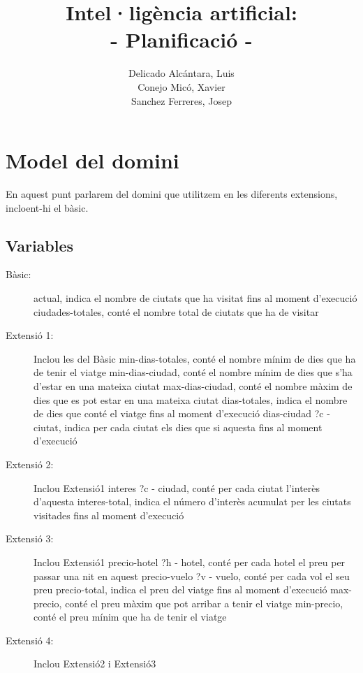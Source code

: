 \documentclass[11pt,a4paper]{article}
\author{
  Delicado Alcántara, Luis
  \\
  Conejo Micó, Xavier
  \\
  Sanchez Ferreres, Josep
}
\title{\Huge {Intel·ligència artificial:}\\ \huge{- Planificació -}}
\begin{document}
\begin{titlepage}
\clearpage\maketitle
\thispagestyle{empty}
\end{titlepage}

\clearpage

\tableofcontents

\newpage

\section{Model del domini}
En aquest punt parlarem del domini que utilitzem en les diferents extensions, incloent-hi el bàsic.

\subsection{Variables}
\begin{description}
\item[Bàsic:] actual, indica el nombre de ciutats que ha visitat fins al moment d'execució
ciudades-totales, conté el nombre total de ciutats que ha de visitar

\item[Extensió 1:] Inclou les del Bàsic
min-dias-totales, conté el nombre mínim de dies que ha de tenir el viatge
min-dias-ciudad, conté el nombre mínim de dies que s'ha d'estar en una mateixa ciutat
max-dias-ciudad, conté el nombre màxim de dies que es pot estar en una mateixa ciutat
dias-totales, indica el nombre de dies que conté el viatge fins al moment d'execució
dias-ciudad ?c - ciutat, indica per cada ciutat els dies que si aquesta fins al moment d'execució

\item[Extensió 2:] Inclou Extensió1
interes ?c - ciudad, conté per cada ciutat l'interès d'aquesta
interes-total, indica el número d'interès acumulat per les ciutats visitades fins al moment d'execució

\item[Extensió 3:] Inclou Extensió1
precio-hotel ?h - hotel, conté per cada hotel el preu per passar una nit en aquest
precio-vuelo ?v - vuelo, conté per cada vol el seu preu
precio-total, indica el preu del viatge fins al moment d'execució
max-precio, conté el preu màxim que pot arribar a tenir el viatge
min-precio, conté el preu mínim que ha de tenir el viatge

\item[Extensió 4:] Inclou Extensió2 i Extensió3
\end{description}
\end{document}
